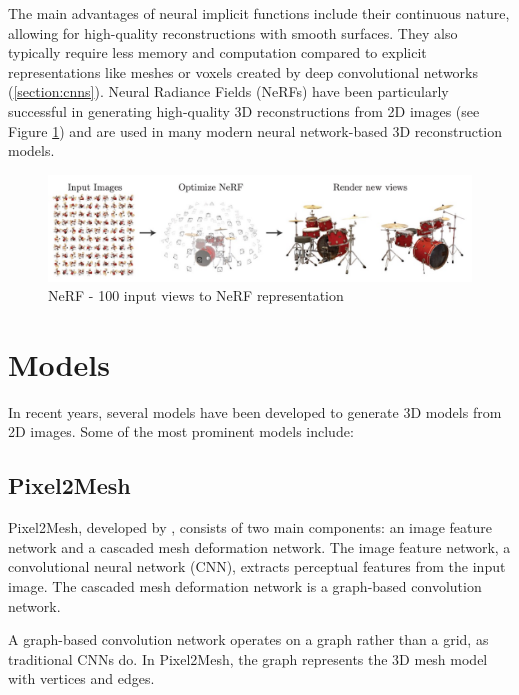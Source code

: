 The main advantages of neural implicit functions include their continuous nature, allowing for high-quality reconstructions with smooth surfaces. They also typically require less memory and computation compared to explicit representations like meshes or voxels created by deep convolutional networks (\ref{section:cnns}).
Neural Radiance Fields (NeRFs) \autocite{mildenhall_nerf_2021} have been particularly successful in generating high-quality 3D reconstructions from 2D images (see Figure \ref{fig:nerf}) and are used in many modern neural network-based 3D reconstruction models.


\begin{figure}
    \centering
    \includegraphics[width=1\linewidth]{images/nerf.jpg}
    \caption{NeRF - 100 input views to NeRF representation \autocite{mildenhall_nerf_2021}}
    \label{fig:nerf}
\end{figure}

\section{Models}

In recent years, several models have been developed to generate 3D models from 2D images. Some of the most prominent models include:

\subsection{Pixel2Mesh}
Pixel2Mesh, developed by \textcite{wang_pixel2mesh_2018}, consists of two main components: an image feature network and a cascaded mesh deformation network. The image feature network, a convolutional neural network (CNN), extracts perceptual features from the input image. The cascaded mesh deformation network is a graph-based convolution network.

A graph-based convolution network operates on a graph rather than a grid, as traditional CNNs do. In Pixel2Mesh, the graph represents the 3D mesh model with vertices and edges.

